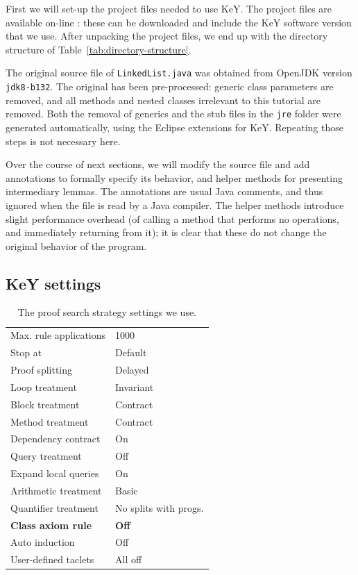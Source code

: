 \documentclass[runningheads]{llncs}
\begin{document}
First we will set-up the project files needed to use KeY. The project files are available on-line : these can be downloaded and include the KeY software version that we use. After unpacking the project files, we end up with the directory structure of Table~\ref{tab:directory-structure}.

The original source file of \texttt{LinkedList.java} was obtained from OpenJDK version \texttt{jdk8-b132}. The original has been pre-processed: generic class parameters are removed, and all methods and nested classes irrelevant to this tutorial are removed. Both the removal of generics and the stub files in the \texttt{jre} folder were generated automatically, using the Eclipse extensions for KeY. Repeating those steps is not necessary here.

Over the course of next sections, we will modify the source file and add annotations to formally specify its behavior, and helper methods for presenting intermediary lemmas. The annotations are usual Java comments, and thus ignored when the file is read by a Java compiler. The helper methods introduce slight performance overhead (of calling a method that performs no operations, and immediately returning from it); it is clear that these do not change the original behavior of the program.

\subsection{KeY settings}

\begin{table}
    \begin{tabular}{l@{\hskip6pt}|@{\hskip6pt}l}
    Max. rule applications & 1000 \\
    Stop at & Default \\
    Proof splitting & Delayed \\
    Loop treatment & Invariant \\
    Block treatment & Contract \\
    Method treatment & Contract \\
    Dependency contract & On \\
    Query treatment & Off \\
    Expand local queries & On \\
    Arithmetic treatment & Basic \\
    Quantifier treatment & No splits with progs. \\
    \textbf{Class axiom rule} & \textbf{Off} \\
    Auto induction & Off \\
    User-defined taclets & All off
    \end{tabular}
    \medskip
    \caption{The proof search strategy settings we use.}
    \vspace*{-20pt}
    \label{tab:proof-strategy}
\end{table}
\end{document}
